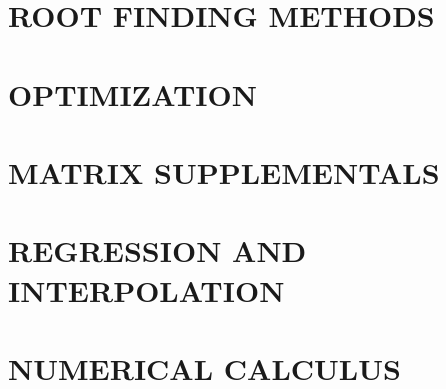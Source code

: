 \documentclass{book}
\begin{document}






\section{ROOT FINDING METHODS}







%

%

\section{OPTIMIZATION}





\section{MATRIX SUPPLEMENTALS}





\section{REGRESSION AND INTERPOLATION}









\section{NUMERICAL CALCULUS}












\end{document}
